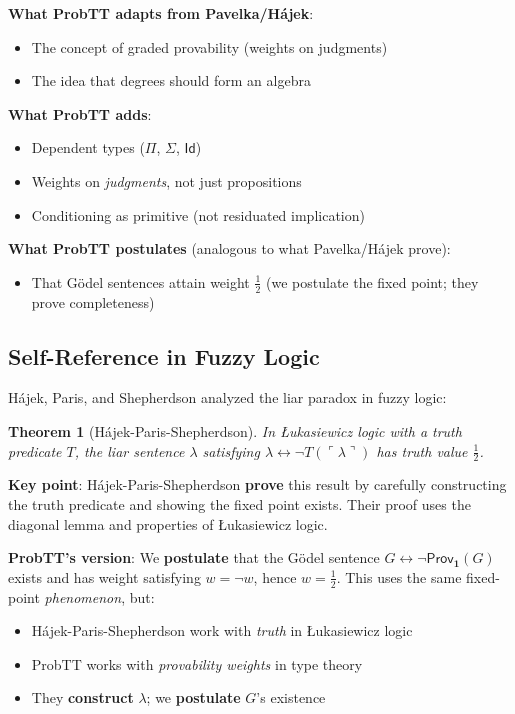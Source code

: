 \documentclass[11pt,a4paper]{article}
\newtheorem{theorem}{Theorem}[section]
\newcommand{\one}{\mathbf{1}}
\newcommand{\negw}{\neg}
\begin{document}
\textbf{What ProbTT adapts from Pavelka/H\'ajek}:
\begin{itemize}
    \item The concept of graded provability (weights on judgments)
    \item The idea that degrees should form an algebra
\end{itemize}

\textbf{What ProbTT adds}:
\begin{itemize}
    \item Dependent types ($\Pi$, $\Sigma$, $\mathsf{Id}$)
    \item Weights on \emph{judgments}, not just propositions
    \item Conditioning as primitive (not residuated implication)
\end{itemize}

\textbf{What ProbTT postulates} (analogous to what Pavelka/H\'ajek prove):
\begin{itemize}
    \item That G\"odel sentences attain weight $\frac{1}{2}$ (we postulate the fixed point; they prove completeness)
\end{itemize}

\subsection{Self-Reference in Fuzzy Logic}

H\'ajek, Paris, and Shepherdson \citep{hajek2000liar} analyzed the liar paradox in fuzzy logic:

\begin{theorem}[H\'ajek-Paris-Shepherdson]
In {\L}ukasiewicz logic with a truth predicate $T$, the liar sentence $\lambda$ satisfying $\lambda \leftrightarrow \neg T(\ulcorner \lambda \urcorner)$ has truth value $\frac{1}{2}$.
\end{theorem}

\textbf{Key point}: H\'ajek-Paris-Shepherdson \textbf{prove} this result by carefully constructing the truth predicate and showing the fixed point exists. Their proof uses the diagonal lemma and properties of {\L}ukasiewicz logic.

\textbf{ProbTT's version}: We \textbf{postulate} that the G\"odel sentence $G \leftrightarrow \neg\mathsf{Prov}_\one(G)$ exists and has weight satisfying $w = \negw w$, hence $w = \frac{1}{2}$. This uses the same fixed-point \emph{phenomenon}, but:
\begin{itemize}
    \item H\'ajek-Paris-Shepherdson work with \emph{truth} in {\L}ukasiewicz logic
    \item ProbTT works with \emph{provability weights} in type theory
    \item They \textbf{construct} $\lambda$; we \textbf{postulate} $G$'s existence
\end{itemize}
\end{document}
